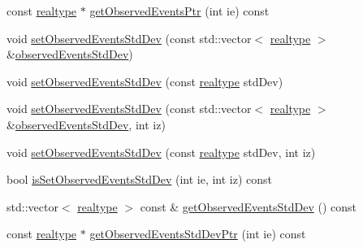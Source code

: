 \begin{DoxyCompactItemize}
\item 
const \mbox{\hyperlink{namespaceamici_a1bdce28051d6a53868f7ccbf5f2c14a3}{realtype}} $\ast$ \mbox{\hyperlink{classamici_1_1_exp_data_a95ab3fe91af62612f202fdc6cd033d2a}{get\+Observed\+Events\+Ptr}} (int ie) const
\item 
void \mbox{\hyperlink{classamici_1_1_exp_data_af55c1775810031cd4b6e283f6dd220be}{set\+Observed\+Events\+Std\+Dev}} (const std\+::vector$<$ \mbox{\hyperlink{namespaceamici_a1bdce28051d6a53868f7ccbf5f2c14a3}{realtype}} $>$ \&\mbox{\hyperlink{classamici_1_1_exp_data_abb12a8f75b4e6c936ae6c0be770628c9}{observed\+Events\+Std\+Dev}})
\item 
void \mbox{\hyperlink{classamici_1_1_exp_data_a7be54ad0b0116325f4955f10a759a018}{set\+Observed\+Events\+Std\+Dev}} (const \mbox{\hyperlink{namespaceamici_a1bdce28051d6a53868f7ccbf5f2c14a3}{realtype}} std\+Dev)
\item 
void \mbox{\hyperlink{classamici_1_1_exp_data_a9fe1de066fcba20ce994d9817442a826}{set\+Observed\+Events\+Std\+Dev}} (const std\+::vector$<$ \mbox{\hyperlink{namespaceamici_a1bdce28051d6a53868f7ccbf5f2c14a3}{realtype}} $>$ \&\mbox{\hyperlink{classamici_1_1_exp_data_abb12a8f75b4e6c936ae6c0be770628c9}{observed\+Events\+Std\+Dev}}, int iz)
\item 
void \mbox{\hyperlink{classamici_1_1_exp_data_a2533798d195c8ede07c783800adf1d82}{set\+Observed\+Events\+Std\+Dev}} (const \mbox{\hyperlink{namespaceamici_a1bdce28051d6a53868f7ccbf5f2c14a3}{realtype}} std\+Dev, int iz)
\item 
bool \mbox{\hyperlink{classamici_1_1_exp_data_a29530529cf50b9fa791e02fed620ea7a}{is\+Set\+Observed\+Events\+Std\+Dev}} (int ie, int iz) const
\item 
std\+::vector$<$ \mbox{\hyperlink{namespaceamici_a1bdce28051d6a53868f7ccbf5f2c14a3}{realtype}} $>$ const  \& \mbox{\hyperlink{classamici_1_1_exp_data_a18cd150b527e08a9dd4a02b242a76d46}{get\+Observed\+Events\+Std\+Dev}} () const
\item 
const \mbox{\hyperlink{namespaceamici_a1bdce28051d6a53868f7ccbf5f2c14a3}{realtype}} $\ast$ \mbox{\hyperlink{classamici_1_1_exp_data_aabab4dfc080fdf961b6a3bbf1aebd631}{get\+Observed\+Events\+Std\+Dev\+Ptr}} (int ie) const
\end{DoxyCompactItemize}
